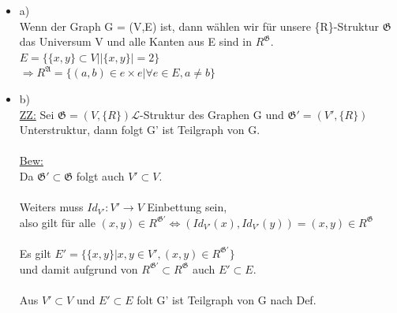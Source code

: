 \documentclass[a4paper]{scrartcl}
\begin{document}
    \begin{itemize}
        \item a)\\
            Wenn der Graph G = (V,E) ist, dann wählen wir für unsere \{R\}-Struktur $\mathfrak{G}$ das Universum V und alle Kanten aus E sind in $R^{\mathfrak{G}}$.\\
            $E = \{\{x,y\} \subset V| |\{x,y\}| = 2\}$\\
            $\Rightarrow R^\mathfrak{A} = \{(a,b) \in e \times e | \forall e \in E, a \neq b\}$

        \item b)\\
            \underline{ZZ:} Sei $\mathfrak{G} = (V, \{R\}) \mathscr{L}$-Struktur des Graphen G und $\mathfrak{G'} = (V', \{R\})$ Unterstruktur, dann folgt G' ist Teilgraph von G.\\
            \\\underline{Bew:}\\
                Da $\mathfrak{G'} \subset \mathfrak{G}$ folgt auch $V' \subset V$.\\
                \\Weiters muss $Id_{V'}: V' \rightarrow V$ Einbettung sein,\\
                also gilt für alle $(x,y) \in R^\mathfrak{G'} \Leftrightarrow  (Id_{V'}(x), Id_{V'}(y)) = (x,y) \in R^\mathfrak{G}$\\
                \\Es gilt $E' = \{\{x,y\} | x,y \in V', (x,y) \in R^{\mathfrak{G'}}\}$\\
                und damit aufgrund von $R^{\mathfrak{G'}} \subset R^{\mathfrak{G}}$ auch $E' \subset E$.\\
                \\Aus $V' \subset V$ und $E' \subset E$ folt G' ist Teilgraph von G nach Def.

\newpage


\end{itemize}
\end{document}
